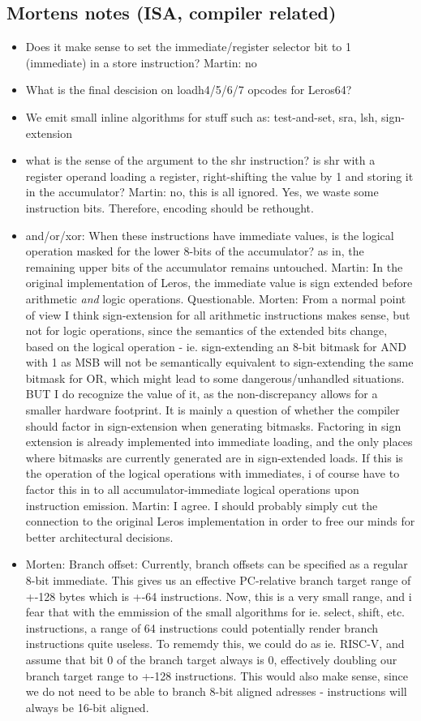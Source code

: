 \documentclass[a4paper,fontsize=10pt,twoside,DIV15,BCOR12mm,headinclude=true,footinclude=false,pagesize,bibtotoc]{scrbook}
\newcommand{\martin}[1]{{\color{blue} Martin: #1}}
\newcommand{\morten}[1]{{\color{red} Morten: #1}}
\begin{document}
\subsection{Mortens notes (ISA, compiler related)}
\begin{itemize}
\item Does it make sense to set the immediate/register selector bit to 1 (immediate) in a store instruction?
\martin{no}
\item What is the final descision on loadh4/5/6/7 opcodes for Leros64?
\item We emit small inline algorithms for stuff such as: test-and-set, sra, lsh, sign-extension
\item what is the sense of the argument to the shr instruction? is shr with a register operand loading a register, right-shifting the value by 1 and storing it in the accumulator?
\martin{no, this is all ignored. Yes, we waste some instruction bits. Therefore, encoding should be rethought.}
\item and/or/xor: When these instructions have immediate values, is the logical operation masked for the lower 8-bits of the accumulator? as in, the remaining upper bits of the accumulator remains untouched.
\martin{In the original implementation of Leros, the immediate value is sign extended before arithmetic \emph{and}
logic operations. Questionable.}
\morten{From a normal point of view I think sign-extension for all arithmetic instructions makes sense, but not for logic operations, since the semantics of the extended bits change, based on the logical operation - ie. sign-extending an 8-bit bitmask for AND with 1 as MSB will not be semantically equivalent to sign-extending the same bitmask for OR, which might lead to some dangerous/unhandled situations. BUT I do recognize the value of it, as the non-discrepancy allows for a smaller hardware footprint. It is mainly a question of whether the compiler should factor in sign-extension when generating bitmasks. Factoring in sign extension is already implemented into immediate loading, and the only places where bitmasks are currently generated are in sign-extended loads. If this is the operation of the logical operations with immediates, i of course have to factor this in to all accumulator-immediate logical operations upon instruction emission.}
\martin{I agree. I should probably simply cut the connection to the original Leros implementation in order to free our
minds for better architectural decisions.}
\item \morten{Branch offset:} Currently, branch offsets can be specified as a regular 8-bit immediate. This gives us an effective PC-relative branch target range of +-128 bytes which is +-64 instructions. Now, this is a very small range, and i fear that with the emmission of the small algorithms for ie. select, shift, etc. instructions, a range of 64 instructions could potentially render branch instructions quite useless. To rememdy this, we could do as ie. RISC-V, and assume that bit 0 of the branch target always is 0, effectively doubling our branch target range to +-128 instructions. This would also make sense, since we do not need to be able to branch 8-bit aligned adresses - instructions will always be 16-bit aligned.

\end{itemize}
\end{document}
